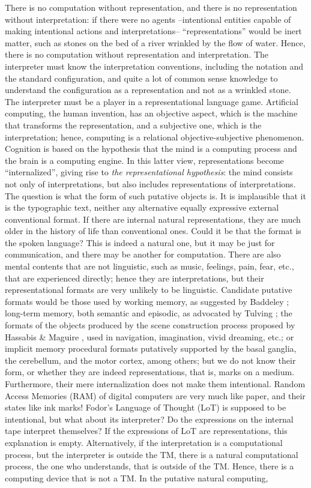 \documentclass[11pt]{article}
\begin{document}
There is no computation without representation, and there is no representation without interpretation: if there were no agents --intentional entities capable of making intentional actions and interpretations--  ``representations'' would be inert matter, such as stones on the bed of a river wrinkled by the flow of water. Hence, there is no computation without representation and interpretation. The interpreter must know the interpretation conventions, including the notation and the standard configuration, and quite a lot of common sense knowledge to understand the configuration as a representation and not as a wrinkled stone. The interpreter must be a player in a representational language game. Artificial computing, the human invention, has an objective aspect, which is the machine that transforms the representation, and a subjective one, which is the interpretation; hence, computing is a relational objective-subjective phenomenon. Cognition is based on the hypothesis that the mind is a computing process and the brain is a computing engine. In this latter view, representations become ``internalized'', giving rise to \emph{the representational hypothesis}: the mind consists not only of interpretations, but also includes representations of interpretations. The question is what the form of such putative objects is. It is implausible that it is the typographic text, neither any alternative equally expressive external conventional format. If there are internal natural representations, they are much older in the history of life than conventional ones. Could it be that the format is the spoken language? This is indeed a natural one, but it may be just for communication, and there may be another for computation. There are also mental contents that are not linguistic, such as music, feelings, pain, fear, etc., that are experienced directly; hence they are interpretations, but their representational formats are very unlikely to be linguistic. Candidate putative formats would be those used by working memory, as suggested by Baddeley \cite{baddeley-1981,baddeley-1992}; long-term memory, both semantic and episodic, as advocated by Tulving \cite{tulving-1984,tulving-2002}; the formats of the objects produced by the scene construction process proposed by Hassabis \& Maguire \cite{Hassabis-2007-trends}, used in navigation, imagination, vivid dreaming, etc.; or implicit memory procedural formats putatively supported by the basal ganglia, the cerebellum, and the motor cortex, among others; but we do not know their form, or whether they are indeed representations, that is, marks on a medium. Furthermore, their mere internalization does not make them intentional. Random Access Memories (RAM) of digital computers are very much like paper, and their states like ink marks! Fodor's Language of Thought (LoT) \cite{Fodor} is supposed to be intentional, but what about its interpreter? Do the expressions on the internal tape interpret themselves? If the expressions of LoT are representations, this explanation is empty. Alternatively, if the interpretation is a computational process, but the interpreter is outside the TM, there is a natural computational process, the one who understands, that is outside of the TM. Hence, there is a computing device that is not a TM. In the putative natural computing, 
\end{document}

